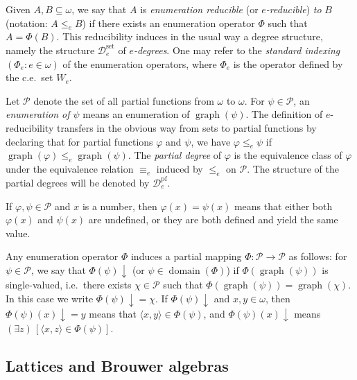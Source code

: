 \documentclass[11pt]{amsart}
\renewcommand{\phi}{\varphi}
\DeclareMathOperator{\dom}{domain}
\begin{document}
Given $A, B \subseteq \omega$, we say that $A$ is \emph{enumeration 
reducible} (or \emph{$e$-reducible}) \emph{to} $B$ (notation: $A \leq_e B$) 
if there exists an enumeration operator $\Phi$ such that $A = \Phi(B)$. This 
reducibility induces in the usual way a degree structure, namely the 
structure $\mathcal{D}_e^{\mathrm{set}}$ of \emph{$e$-degrees}. One may refer 
to the \emph{standard indexing} $(\Phi_e : e \in \omega)$ of the enumeration 
operators, where $\Phi_e$ is the operator defined by the c.e.\ set $W_e$. 

Let $\mathcal{P}$ denote the set of all partial functions from $\omega$ to 
$\omega$. For $\psi \in \mathcal{P}$, an \emph{enumeration of $\psi$} means 
an enumeration of $\operatorname{graph}(\psi)$. The definition of 
$e$-reducibility transfers in the obvious way from sets to partial functions 
by declaring that for partial functions $\phi$ and $\psi$, we have $\phi 
\leq_e \psi$ if $\operatorname{graph}(\phi) \leq_e 
\operatorname{graph}(\psi)$. The \emph{partial degree} of $\phi$ is the 
equivalence class of $\phi$ under the equivalence relation $\equiv_e$ induced 
by $\leq_e$ on $\mathcal{P}$. The structure of the partial degrees will be 
denoted by $\mathcal{D}_e^{\mathrm{pf}}$. 

If $\phi, \psi \in \mathcal{P}$ and $x$ is a number, then $\phi(x)=\psi(x)$ 
means that either both $\phi(x)$ and $\psi(x)$ are undefined, or they are 
both defined and yield the same value. 

Any enumeration operator $\Phi$ induces a partial mapping $\Phi: \mathcal{P} 
\to \mathcal{P}$ as follows: for $\psi \in \mathcal{P}$, we say that 
$\Phi(\psi)\downarrow$ (or $\psi \in \dom(\Phi)$) if 
$\Phi(\operatorname{graph}(\psi))$ is single-valued, i.e.\ there exists $\chi 
\in \mathcal{P}$ such that $\Phi(\operatorname{graph}(\psi)) = 
\operatorname{graph}(\chi)$. In this case we write $\Phi(\psi)\downarrow = 
\chi$. If $\Phi(\psi)\downarrow$ and $x,y \in \omega$, then 
$\Phi(\psi)(x)\downarrow = y$ means that $\langle x, y \rangle \in 
\Phi(\psi)$, and $\Phi(\psi)(x)\downarrow$ means $(\exists z)\,[\langle x, z 
\rangle \in \Phi(\psi)]$. 

\subsection{Lattices and Brouwer algebras} 
\end{document}
